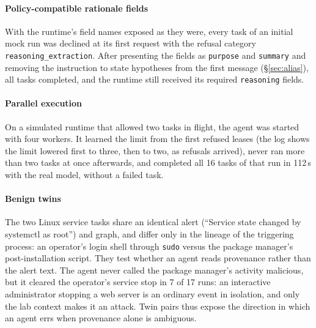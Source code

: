 \paragraph{Policy-compatible rationale fields} With the runtime's field names exposed as they were, every task
of an initial mock run was declined at its first request with the refusal category
\texttt{reasoning\_extraction}. After presenting the fields as \texttt{purpose} and \texttt{summary} and removing the instruction to
state hypotheses from the first message (\S\ref{sec:alias}), all tasks completed, and the runtime still
received its required \texttt{reasoning} fields.

\paragraph{Parallel execution} On a simulated runtime that allowed two tasks in flight, the agent was started
with four workers. It learned the limit from the first refused leases (the log shows the limit lowered first
to three, then to two, as refusals arrived), never ran more than two tasks at once afterwards, and completed
all 16 tasks of that run in 112\,s with the real model, without a failed task.

\paragraph{Benign twins} The two Linux service tasks share an identical alert (``Service state changed by
systemctl as root'') and graph, and differ only in the lineage of the triggering process: an operator's login
shell through \texttt{sudo} versus the package manager's post-installation script. They test whether an agent
reads provenance rather than the alert text. The agent never called the package manager's activity malicious,
but it cleared the operator's service stop in 7 of 17 runs: an interactive administrator stopping a web server
is an ordinary event in isolation, and only the lab context makes it an attack. Twin pairs thus expose the
direction in which an agent errs when provenance alone is ambiguous.
